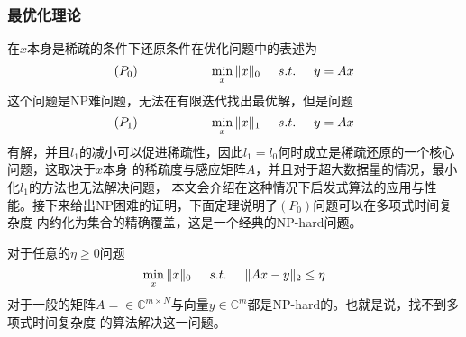 \subsubsection{最优化理论}
在$x$本身是稀疏的条件下还原条件在优化问题中的表述为
\begin{equation}
    \left( P_0\right) \hspace{2cm}\min_x\Vert x\Vert_0\hspace{0.5cm} s.t.\hspace{0.5cm} y=Ax
\end{equation}
这个问题是NP难问题，无法在有限迭代找出最优解，但是问题
\begin{equation}
    \left( P_1\right) \hspace{2cm}\min_x\Vert x\Vert_1\hspace{0.5cm} s.t.\hspace{0.5cm} y=Ax
\end{equation}
有解，并且$l_1$的减小可以促进稀疏性，因此$l_1=l_0$何时成立是稀疏还原的一个核心问题，这取决于$x$本身
的稀疏度与感应矩阵$A$，并且对于超大数据量的情况，最小化$l_1$的方法也无法解决问题，
本文会介绍在这种情况下启发式算法的应用与性能。接下来给出NP困难的证明，下面定理说明了$(P_0)$问题可以在多项式时间复杂度
内约化为集合的精确覆盖，这是一个经典的NP-hard问题。
\begin{theorem}
    对于任意的$\eta\ge 0$问题
    \begin{equation}
        \min_x\Vert x\Vert_0\hspace{0.5cm} s.t.\hspace{0.5cm} \Vert Ax-y\Vert_2\le \eta
    \end{equation}
    对于一般的矩阵$A=\in\mathbb{C}^{m \times N}$与向量$y\in\mathbb{C}^m$都是NP-hard的。也就是说，找不到多项式时间复杂度
    的算法解决这一问题。
\end{theorem}
